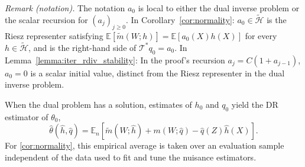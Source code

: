 \documentclass[12pt]{article}
\theoremstyle{plain}
\theoremstyle{definition}
\theoremstyle{remark}
\begin{document}
\noindent\textit{Remark (notation).} The notation $a_0$ is local to either the dual inverse problem or the scalar recursion for $(a_j)_{j\geqslant0}$. In Corollary~\ref{cor:normality}: $a_0\in\tilde{\mathcal H}$ is the Riesz representer satisfying $\mathbb E[\tilde m(W;h)]=\mathbb E[a_0(X)h(X)]$ for every $h\in\tilde{\mathcal H}$, and is the right-hand side of $\mathcal T^*q_0=a_0$. In Lemma~\ref{lemma:iter_rdiv_stability}: In the proof's recursion $a_j=C(1+a_{j-1})$, $a_0=0$ is a scalar initial value, distinct from the Riesz representer in the dual inverse problem.


When the dual problem has a solution, estimates of $h_{0}$ and $q_{0}$ yield the DR estimator \citep{bennett2023source} of $\theta_0$,
\[
\hat{\theta }(\hat{h},\hat{q}) =\mathbb{E}_{n}\left[\tilde{m}( W;\hat{h}) +m( W;\hat{q}) -\hat{q}( Z) \hat{h}( X)\right] .
\]
For \cref{cor:normality}, this empirical average is taken over an evaluation sample independent of the data used to fit and tune the nuisance estimators.
\end{document}
